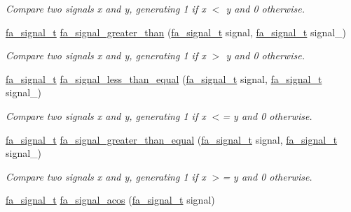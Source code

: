 \begin{DoxyCompactItemize}
\begin{DoxyCompactList}\small\item\em Compare two signals {\ttfamily x} and {\ttfamily y}, generating 1 if {\ttfamily x $<$ y} and 0 otherwise. \end{DoxyCompactList}\item 
\hyperlink{group___fa_signal_gac5c72f160cd6e93a6783551627b166e5}{fa\-\_\-signal\-\_\-t} \hyperlink{group___fa_signal_ga3b229bd01606fe2357d7797574673fe5}{fa\-\_\-signal\-\_\-greater\-\_\-than} (\hyperlink{group___fa_signal_gac5c72f160cd6e93a6783551627b166e5}{fa\-\_\-signal\-\_\-t} signal, \hyperlink{group___fa_signal_gac5c72f160cd6e93a6783551627b166e5}{fa\-\_\-signal\-\_\-t} signal\-\_\-)
\begin{DoxyCompactList}\small\item\em Compare two signals {\ttfamily x} and {\ttfamily y}, generating 1 if {\ttfamily x $>$ y} and 0 otherwise. \end{DoxyCompactList}\item 
\hyperlink{group___fa_signal_gac5c72f160cd6e93a6783551627b166e5}{fa\-\_\-signal\-\_\-t} \hyperlink{group___fa_signal_ga623fcf4374111f7e8adcd2e679da441d}{fa\-\_\-signal\-\_\-less\-\_\-than\-\_\-equal} (\hyperlink{group___fa_signal_gac5c72f160cd6e93a6783551627b166e5}{fa\-\_\-signal\-\_\-t} signal, \hyperlink{group___fa_signal_gac5c72f160cd6e93a6783551627b166e5}{fa\-\_\-signal\-\_\-t} signal\-\_\-)
\begin{DoxyCompactList}\small\item\em Compare two signals {\ttfamily x} and {\ttfamily y}, generating 1 if {\ttfamily x $<$= y} and 0 otherwise. \end{DoxyCompactList}\item 
\hyperlink{group___fa_signal_gac5c72f160cd6e93a6783551627b166e5}{fa\-\_\-signal\-\_\-t} \hyperlink{group___fa_signal_ga2ec3888c4cf567576848a4d435f0037d}{fa\-\_\-signal\-\_\-greater\-\_\-than\-\_\-equal} (\hyperlink{group___fa_signal_gac5c72f160cd6e93a6783551627b166e5}{fa\-\_\-signal\-\_\-t} signal, \hyperlink{group___fa_signal_gac5c72f160cd6e93a6783551627b166e5}{fa\-\_\-signal\-\_\-t} signal\-\_\-)
\begin{DoxyCompactList}\small\item\em Compare two signals {\ttfamily x} and {\ttfamily y}, generating 1 if {\ttfamily x $>$= y} and 0 otherwise. \end{DoxyCompactList}\item 
\hyperlink{group___fa_signal_gac5c72f160cd6e93a6783551627b166e5}{fa\-\_\-signal\-\_\-t} \hyperlink{group___fa_signal_ga5f0f212baf9bbbfc9915cbb19ed9e543}{fa\-\_\-signal\-\_\-acos} (\hyperlink{group___fa_signal_gac5c72f160cd6e93a6783551627b166e5}{fa\-\_\-signal\-\_\-t} signal)

\end{DoxyCompactItemize}
